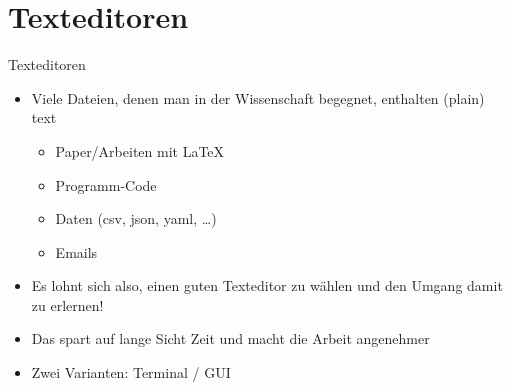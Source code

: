 \section{Texteditoren}



\begin{frame}{Texteditoren}
  \begin{itemize}
    \item Viele Dateien, denen man in der Wissenschaft begegnet, enthalten (plain) text
      \begin{itemize}
        \item Paper/Arbeiten mit \LaTeX
        \item Programm-Code
        \item Daten (csv, json, yaml, …)
        \item Emails
      \end{itemize}
    \item Es lohnt sich also, einen guten Texteditor zu wählen und den Umgang damit zu erlernen!
    \item Das spart auf lange Sicht Zeit und macht die Arbeit angenehmer
    \item Zwei Varianten: Terminal / GUI
  \end{itemize}
\end{frame}

